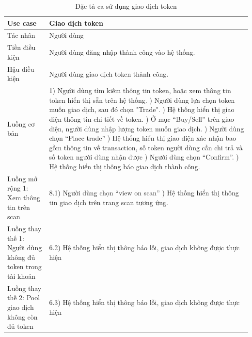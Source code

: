 \begin{table}[H]
    \centering
    \begin{tabular}{|p{5cm}|p{8cm}|}
        \hline
        Use case                                                    & Giao dịch token                                                  \\
        \hline
        Tác nhân                                                    & Người dùng                                                       \\
        \hline
        Tiền điều kiện                                              & Người dùng đăng nhập thành công vào hệ thống.                    \\
        \hline
        Hậu điều kiện                                               & Người dùng giao dịch token thành công.                           \\
        \hline
        Luồng cơ bản                                                & 1) Người dùng tìm kiếm thông tin token, hoặc xem thông tin token
        hiển thị sẵn trên hệ thống. \newline
        2) Người dùng lựa chọn token muốn giao dịch, sau đó chọn "Trade". \newline
        3) Hệ thống hiển thị giao diện thông tin chi tiết về token. \newline
        4) Ở mục ``Buy/Sell'' trên giao diện, người dùng nhập lượng token muốn giao
        dịch. \newline
        5) Người dùng chọn ``Place trade'' \newline
        6) Hệ thống hiển thị giao diện xác nhận bao gồm thông tin về transaction, số
        token người dùng cần chi trả và số token người dùng nhận được \newline
        7) Người dùng chọn ``Confirm''. \newline
        8) Hệ thống hiển thị thông báo giao dịch thành công.                                                                           \\
        \hline
        Luồng mở rộng 1: Xem thông tin trên scan                    & 8.1) Người dùng chọn ``view on
        scan'' \newline
        9.1) Hệ thống hiển thị thông tin giao dịch trên trang scan tương ứng.                                                          \\
        \hline
        Luồng thay thế 1: Người dùng không đủ token trong tài khoản & 6.2) Hệ thống
        hiển thị thông báo lỗi, giao dịch không được thực hiện                                                                         \\
        \hline
        Luồng thay thế 2: Pool giao dịch không còn đủ token         & 6.3) Hệ thống hiển thị
        thông báo lỗi, giao dịch không được thực hiện                                                                                  \\
        \hline
    \end{tabular}
    \caption{Đặc tả ca sử dụng giao dịch token}
    \label{tab:token-transaction}
\end{table}

